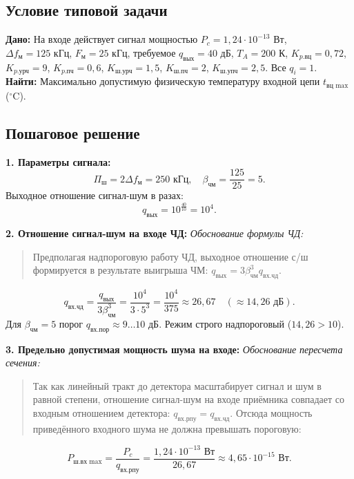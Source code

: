 \documentclass[12pt,a4paper]{article}
\begin{document}
\subsection{Условие типовой задачи}
\textbf{Дано:} На входе действует сигнал мощностью $P_c = 1{,}24 \cdot 10^{-13}\text{ Вт}$, $\Delta f_{\text{м}} = 125\text{ кГц}$, $F_{\text{м}} = 25\text{ кГц}$, требуемое $q_{\text{вых}} = 40\text{ дБ}$, $T_A = 200\text{ К}$, $K_{p.\text{вц}} = 0{,}72$, $K_{p.\text{урч}} = 9$, $K_{p.\text{пч}} = 0{,}6$, $K_{\text{ш.урч}} = 1{,}5$, $K_{\text{ш.пч}} = 2$, $K_{\text{ш.упч}} = 2{,}5$. Все $q_i = 1$.\\
\textbf{Найти:} Максимально допустимую физическую температуру входной цепи $t_{\text{вц max}}$ ($^\circ\text{C}$).

\subsection{Пошаговое решение}

\textbf{1. Параметры сигнала:}
\begin{equation}
\Pi_{\text{ш}} = 2 \Delta f_{\text{м}} = 250\text{ кГц}, \quad \beta_{\text{чм}} = \frac{125}{25} = 5.
\end{equation}
Выходное отношение сигнал-шум в разах:
\begin{equation}
q_{\text{вых}} = 10^{\frac{40}{10}} = 10^4.
\end{equation}

\textbf{2. Отношение сигнал-шум на входе ЧД:}
\textit{Обоснование формулы ЧД:}
\begin{quote}
Предполагая надпороговую работу ЧД, выходное отношение с/ш формируется в результате выигрыша ЧМ: $q_{\text{вых}} = 3 \beta_{\text{чм}}^3 q_{\text{вх.чд}}$.
\end{quote}
\begin{equation}
q_{\text{вх.чд}} = \frac{q_{\text{вых}}}{3 \beta_{\text{чм}}^3} = \frac{10^4}{3 \cdot 5^3} = \frac{10^4}{375} \approx 26{,}67 \quad (\approx 14{,}26\text{ дБ}).
\end{equation}
Для $\beta_{\text{чм}} = 5$ порог $q_{\text{вх.пор}} \approx 9\dots10\text{ дБ}$. Режим строго надпороговый ($14{,}26 > 10$).

\textbf{3. Предельно допустимая мощность шума на входе:}
\textit{Обоснование пересчета сечения:}
\begin{quote}
Так как линейный тракт до детектора масштабирует сигнал и шум в равной степени, отношение сигнал-шум на входе приёмника совпадает со входным отношением детектора: $q_{\text{вх.рпу}} = q_{\text{вх.чд}}$. Отсюда мощность приведённого входного шума не должна превышать пороговую:
\end{quote}
\begin{equation}
P_{\text{ш.вх max}} = \frac{P_c}{q_{\text{вх.рпу}}} = \frac{1{,}24 \cdot 10^{-13}\text{ Вт}}{26{,}67} \approx 4{,}65 \cdot 10^{-15}\text{ Вт}.
\end{equation}
\end{document}
